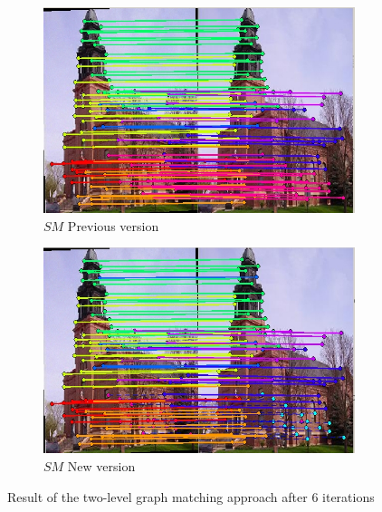 \documentclass[
	fontsize=12pt,
	paper=a4,
	twoside=false,
	numbers=noenddot,
	plainheadsepline,
	toc=listof,
	toc=bibliography
]{scrartcl}
\begin{document}
\begin{figure}[ht] 
	\begin{subfigure}[b]{0.5\textwidth}
		\centering
		\includegraphics[scale=0.35]{fig/method1/test1/LL_it6.jpg} 
		\caption{$SM$ Previous version} 
	\end{subfigure}%
	\begin{subfigure}[b]{0.5\textwidth}
		\centering
		\includegraphics[scale=0.35]{test1/it6.jpg} 
		\caption{$SM$ New version} 
	\end{subfigure} 
	\caption{Result of the two-level graph matching approach after $6$ iterations }
\end{figure}
\end{document}
